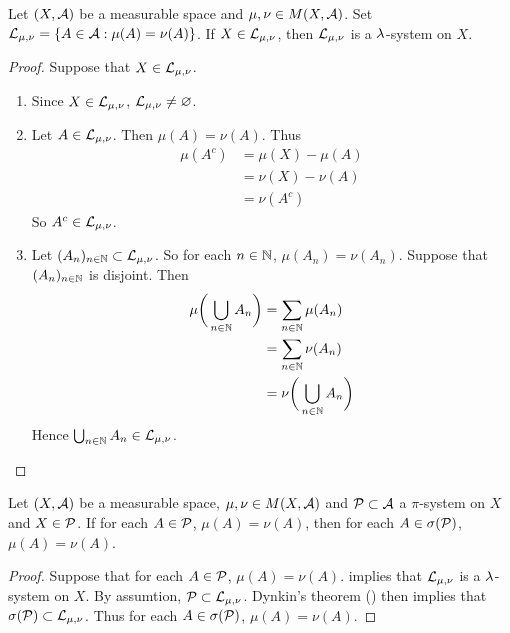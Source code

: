 \documentclass{book}
\begin{document}
	\begin{ex}  
		Let $(X, \mathcal{A})$ be a measurable space and $\mu, \nu \in M(X, \mathcal{A})$. Set $\mathcal{L}_{\mu,\nu} = \{A \in \mathcal{A}: \mu(A) = \nu(A)\}$. If $X \in \mathcal{L}_{\mu, \nu}$, then $\mathcal{L}_{\mu, \nu}$ is a $\lambda$-system on $X$.
	\end{ex}
	
	\begin{proof} Suppose that  $X \in \mathcal{L}_{\mu, \nu}$.
		\begin{enumerate}
			\item Since $X \in \mathcal{L}_{\mu, \nu}$, $\mathcal{L}_{\mu, \nu} \neq \varnothing$.
			\item Let $A \in \mathcal{L}_{\mu, \nu}$. Then $\mu(A) = \nu(A)$. Thus 
			\begin{align*}
				\mu(A^c) 
				&= \mu(X)-\mu(A) \\
				&= \nu(X) -\nu(A) \\
				&= \nu(A^c)
			\end{align*}
			So $A^c \in \mathcal{L}_{\mu, \nu}$. 
			\item Let $(A_n)_{n \in \mathbb{N}} \subset \mathcal{L}_{\mu, \nu}$. So for each $n \in \mathbb{N}$, $\mu(A_n) = \nu(A_n)$.  Suppose that $(A_n)_{n \in \mathbb{N}}$ is disjoint. Then 
			\begin{align*}
				\mu\bigg(\bigcup_{n \in \mathbb{N}} A_n\bigg) 
				&= \sum\limits_{n \in \mathbb{N}} \mu(A_n) \\
				&= \sum\limits_{n \in \mathbb{N}} \nu(A_n) \\
				&= \nu\bigg(\bigcup_{n \in \mathbb{N}} A_n\bigg) 
			\end{align*}
			Hence $\bigcup_{n \in \mathbb{N}} A_n \in \mathcal{L}_{\mu, \nu}$.
		\end{enumerate}
	\end{proof}
	
	\begin{ex}  
		Let $(X, \mathcal{A})$ be a measurable space, $\mu, \nu \in M(X, \mathcal{A})$ and $\mathcal{P} \subset \mathcal{A}$ a $\pi$-system on $X$ and $X \in \mathcal{P}$. If for each $A \in \mathcal{P}$, $\mu(A) = \nu(A)$, then for each $A \in \sigma(\mathcal{P})$, $\mu(A) = \nu(A)$.
	\end{ex}
	
	\begin{proof}
		Suppose that for each $A \in \mathcal{P}$, $\mu(A) = \nu(A)$.  implies that $\mathcal{L}_{\mu, \nu}$ is a $\lambda$-system on $X$. By assumtion, $\mathcal{P} \subset \mathcal{L}_{\mu, \nu}$. Dynkin's theorem () then implies that $\sigma(\mathcal{P}) \subset \mathcal{L}_{\mu, \nu}$. Thus for each $A \in \sigma(\mathcal{P})$, $\mu(A) = \nu(A)$.
	\end{proof}
\end{document}
